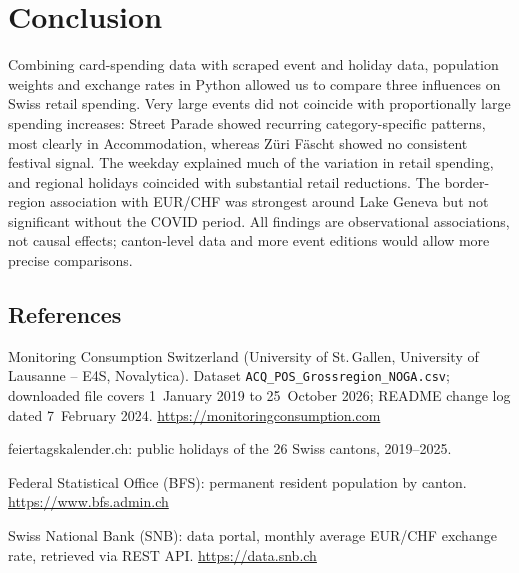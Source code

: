 \documentclass[10pt]{article}
\makeatletter
\let\plainsection\section
\renewcommand{\section}{\Needspace*{6\baselineskip}\plainsection}
\renewcommand{\refname}{References}
\renewenvironment{thebibliography}[1]
  {\subsection*{\refname}\footnotesize
   \list{\@biblabel{\@arabic\c@enumiv}}%
        {\settowidth\labelwidth{\@biblabel{#1}}\leftmargin\labelwidth\advance\leftmargin\labelsep
         \itemsep 1pt\parsep 0pt\usecounter{enumiv}\let\p@enumiv\@empty\renewcommand\theenumiv{\@arabic\c@enumiv}}%
   \sloppy}
  {\endlist}
\makeatother
\begin{document}
\section{Conclusion}
Combining card-spending data with scraped event and holiday data, population weights and exchange rates in Python allowed us to compare three influences on Swiss retail spending. Very large events did not coincide with proportionally large spending increases: Street Parade showed recurring category-specific patterns, most clearly in Accommodation, whereas Züri Fäscht showed no consistent festival signal. The weekday explained much of the variation in retail spending, and regional holidays coincided with substantial retail reductions. The border-region association with EUR/CHF was strongest around Lake Geneva but not significant without the COVID period. All findings are observational associations, not causal effects; canton-level data and more event editions would allow more precise comparisons.

\begin{thebibliography}{9}
 \raggedright Monitoring Consumption Switzerland (University of St.\,Gallen, University of Lausanne -- E4S, Novalytica). Dataset \texttt{ACQ\_POS\_Grossregion\_NOGA.csv}; downloaded file covers 1~January 2019 to 25~October 2026; README change log dated 7~February 2024. \url{https://monitoringconsumption.com}
 \raggedright feiertagskalender.ch: public holidays of the 26 Swiss cantons, 2019--2025.
 \raggedright Federal Statistical Office (BFS): permanent resident population by canton. \url{https://www.bfs.admin.ch}
 \raggedright Swiss National Bank (SNB): data portal, monthly average EUR/CHF exchange rate, retrieved via REST API. \url{https://data.snb.ch}
\end{thebibliography}
\end{document}
